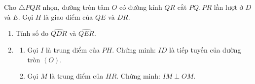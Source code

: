 \begin{ex} %
	Cho $\triangle PQR$ nhọn, đường tròn tâm $O$ có đường kính $QR$ cắt $PQ, PR$ lần lượt ở $D$ và $E$. Gọi $H$ là giao điểm của $QE$ và $DR$.
	\begin{enumerate}
		\item[1)] Tính số đo $\widehat{QDR}$ và $\widehat{QER}$.
		\item[2)] 
		\begin{enumerate}
			\item[a)] Gọi $I$ là trung điểm của $PH$. Chứng minh: $ID$ là tiếp tuyến của đường tròn $(O)$.
			\item[b)] Gọi $M$ là trung điểm của $HR$. Chứng minh: $IM \perp OM$.
		\end{enumerate}
	\end{enumerate}
\end{ex}

